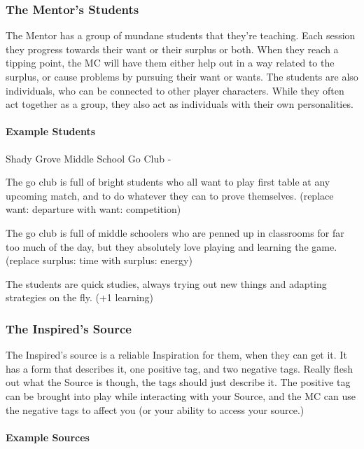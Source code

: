 \documentclass[
  oneside,
  statementpaper,
  9pt]{memoir}
\begin{document}
\hypertarget{the-mentors-students}{%
\subsubsection{The Mentor's Students}\label{the-mentors-students}}

The Mentor has a group of mundane students that they're teaching. Each
session they progress towards their want or their surplus or both. When
they reach a tipping point, the MC will have them either help out in a
way related to the surplus, or cause problems by pursuing their want or
wants. The students are also individuals, who can be connected to other
player characters. While they often act together as a group, they also
act as individuals with their own personalities.

\hypertarget{example-students}{%
\paragraph{Example Students}\label{example-students}}

Shady Grove Middle School Go Club -

The go club is full of bright students who all want to play first table
at any upcoming match, and to do whatever they can to prove themselves.
(replace want: departure with want: competition)

The go club is full of middle schoolers who are penned up in classrooms
for far too much of the day, but they absolutely love playing and
learning the game. (replace surplus: time with surplus: energy)

The students are quick studies, always trying out new things and
adapting strategies on the fly. (+1 learning)

\hypertarget{the-inspireds-source}{%
\subsubsection{The Inspired's Source}\label{the-inspireds-source}}

The Inspired's source is a reliable Inspiration for them, when they can
get it. It has a form that describes it, one positive tag, and two
negative tags. Really flesh out what the Source is though, the tags
should just describe it. The positive tag can be brought into play while
interacting with your Source, and the MC can use the negative tags to
affect you (or your ability to access your source.)

\hypertarget{example-sources}{%
\paragraph{Example Sources}\label{example-sources}}
\end{document}
